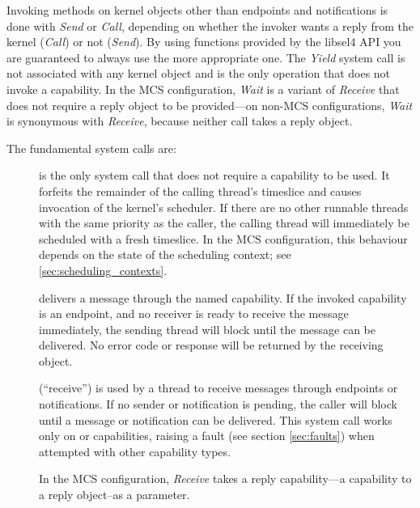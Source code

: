 Invoking methods on kernel objects other than endpoints and notifications is
done with \emph{Send} or \emph{Call}, depending on whether the invoker
wants a reply from the kernel (\emph{Call}) or not (\emph{Send}).  By using
functions provided by the libsel4 API you are guaranteed to always use the more
appropriate one.  The \emph{Yield} system call is not associated with any kernel
object and is the only operation that does not invoke a capability.  In the MCS
configuration, \emph{Wait} is a variant of \emph{Receive} that does not require
a reply object to be provided---on non-MCS configurations, \emph{Wait} is
synonymous with \emph{Receive}, because neither call takes a reply object.

The fundamental system calls are:
\begin{description}
    \item[] is the only system call that does
    not require a capability to be used.  It forfeits the remainder of the
    calling thread's timeslice and causes invocation of the kernel's scheduler.
    If there are no other runnable threads with the same priority as the caller,
    the calling thread will immediately be scheduled with a fresh timeslice.  In
    the MCS configuration, this behaviour depends on the state of the scheduling
    context; see \autoref{sec:scheduling_contexts}.

    \item[] delivers a message through the named
    capability.  If the invoked capability is an endpoint, and no receiver is
    ready to receive the message immediately, the sending thread will block
    until the message can be delivered.  No error code or response will be
    returned by the receiving object.

    \item[] (``receive'') is used by a thread to
    receive messages through endpoints or notifications.  If no sender or
    notification is pending, the caller will block until a message or
    notification can be delivered.  This system call works only on
     or  capabilities, raising a fault (see
    section \ref{sec:faults}) when attempted with other capability types.

    In the MCS configuration, \emph{Receive} takes a reply capability---a
    capability to a reply object--as a parameter.
\end{description}


